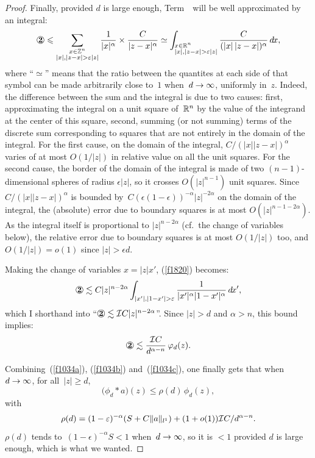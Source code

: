 \begin{proof}
Finally, provided $d$ is large enough, Term~\twocirc\ will be well approximated by an integral:
\[\label{f1820} \twocirc \leq
\sum_{\substack{x\in\ZZ^n\\|x|,|z-x|>\epsilon|z|}} \frac{1}{|x|^\alpha}\times\frac{C}{|z-x|^\alpha}
\simeq \int_{\begin{subarray}{l}x\in\RR^n\\|x|,|z-x|>\epsilon|z|\end{subarray}}
\frac{C}{(|x|\,|z-x|)^\alpha}\, \dx{x} ,\]
where ``$\simeq$'' means that the ratio between the quantites at each side of that symbol
can be made arbitrarily close to~$1$ when~$d \to \infty$, uniformly in~$z$.
%
Indeed, the difference between the sum and the integral
is due to two causes: first, approximating the integral on a unit square of~$\mathbb{R}^n$
by the value of the integrand at the center of this square, second, summing (or not summing)
terms of the discrete sum corresponding to squares
that are not entirely in the domain of the integral.
%
For the first cause,
on the domain of the integral, $C/(|x||z-x|)^\alpha$
varies of at most $O(1/|z|)$ in relative value on all the unit squares.
For the second cause, the border of the domain of the integral
is made of two $(n-1)$-dimensional spheres of radius $\epsilon |z|$,
so it crosses $O(|z|^{n-1})$ unit squares. Since $C/(|x||z-x|)^\alpha$
is bounded by~$C(\epsilon(1-\epsilon))^{-\alpha} |z|^{-2\alpha}$
on the domain of the integral, the (absolute) error due to boundary squares
is at most $O(|z|^{n-1-2\alpha})$. As the integral itself is proportional to
$|z|^{n-2\alpha}$ (cf.\ the change of variables below),
the relative error due to boundary squares is at most $O(1/|z|)$ too,
and $O(1/|z|) = o(1)$ since $|z| > \epsilon d$.

Making the change of variables $x = |z|x'$, (\ref{f1820}) becomes:
\[ \twocirc \lesssim C|z|^{n-2\alpha}
\int_{|x'|,|1-x'|>\epsilon} \frac{1}{|x'|^\alpha|1-x'|^\alpha} \, \dx{x'} ,\]
which I shorthand into ``$\twocirc \lesssim \mcal{I}C|z|^{n-2\alpha}$''.
Since $|z|>d$ and $\alpha > n$, this bound implies:
\[\label{f1034c} \twocirc \lesssim \frac{\mcal{I}C}{d^{\alpha-n}} \, \phi_d(z) .\]

Combining~(\ref{f1034a}), (\ref{f1034b}) and~(\ref{f1034c}),
one finally gets that when~$d\to\infty$, for all~$|z|\geq d$,
\[ \big(\phi_d*a\big)(z) \leq \rho(d) \, \phi_d(z) ,\]
with
\[ \rho(d) = (1-\varepsilon)^{-\alpha} (S+C\|a\|_{l^1})
+ (1+o(1)) \mathcal{I}C/d^{\alpha-n} .\]
$\rho(d)$ tends to~$(1-\epsilon)^{-\alpha} S < 1$ when~$d\to\infty$,
so it is $<1$ provided $d$ is large enough, which is what we wanted.\linebreak[1]\strut
\end{proof}\endgroup

